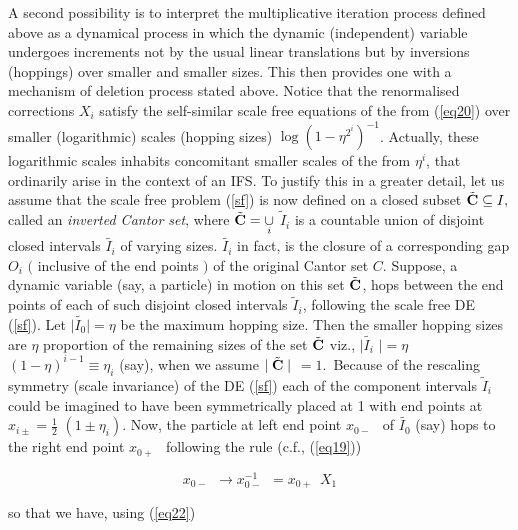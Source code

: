 \documentclass[12pt]{article}
\begin{document}
\vspace{.25cm}

A second possibility is to interpret the multiplicative iteration process defined
above as a dynamical process in which the dynamic (independent) variable
undergoes increments not by the usual linear translations but by inversions
(hoppings) over smaller and smaller sizes. This then provides one with a
mechanism of deletion process stated above. Notice that the renormalised
corrections $X_{i}$ satisfy the self-similar scale free equations of the
from (\ref{eq20}) over smaller (logarithmic) scales (hopping sizes) $\log \left( 1-\eta
^{2^{i}}\right) ^{-1}$. Actually, these logarithmic scales inhabits
concomitant smaller scales of the from $\eta ^{i}$, that ordinarily arise in the 
context of an IFS. To justify this in a
greater detail, let us assume that the scale free problem (\ref{sf}) is now
defined on a closed subset $\tilde{\bf C}\subseteq I,$ called an {\em inverted Cantor
set}, where $\tilde{\bf C}=\underset{i}{\cup }$ $\tilde{I}_{i}$ is a countable
union of disjoint closed intervals $\tilde{I_i}$  of varying sizes. $%
\tilde{I_i}$  in fact, is the closure of a corresponding gap $O_{i}$ $($%
inclusive of the end points $)$ of the original Cantor set $C$. Suppose, a
dynamic variable (say, a particle) in motion on this set $\tilde{\bf C}$, hops
between the end points of each of such disjoint closed intervals $\tilde{I}%
_{i}$, following the scale free DE (\ref{sf}).
Let $\mid \tilde{I_0}\mid = \eta$   be the maximum hopping size. Then
the smaller hopping sizes are $\eta $ proportion of the remaining sizes of
the set $\tilde{\bf C}$ viz.,
$\mid \tilde{I_i}$  $\mid =\eta $ $(1-\eta )^{i-1}\equiv \eta_i$ (say), when we assume $%
\mid \tilde{\bf C}\mid $ $=1.$\ Because of the rescaling symmetry (scale
invariance) of the DE (\ref{sf}) each of the component
intervals $\tilde{I}_{i}$ could be imagined to have been symmetrically
placed at 1 with end points at $x_{i\pm }=\frac{1}{2}$ $(1\pm \eta_i).$ Now,
the particle at left end point $x_{0-\text{ }}$ of $\tilde{I_0}$ (say)  hops
to the right end point $x_{0+\text{ }}$ following the rule (c.f., (\ref{eq19}))

\begin{equation}\label{eq23}
x_{0-\text{ }}\rightarrow x_{0-\text{ }}^{-1}=x_{0+\text{ }}{X}_{1}
\end{equation}

\noindent so that we have, using (\ref{eq22})
\end{document}

